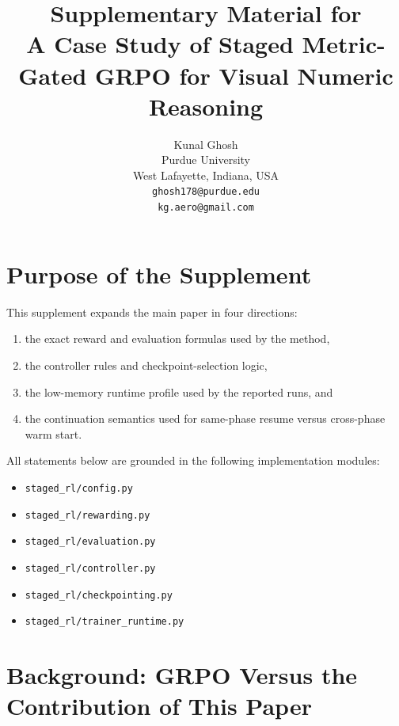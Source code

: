 \documentclass{article} %
\title{Supplementary Material for\\A Case Study of Staged Metric-Gated GRPO for Visual Numeric Reasoning}
\author{Kunal Ghosh\\
Purdue University\\
West Lafayette, Indiana, USA\\
\texttt{ghosh178@purdue.edu}\\
\texttt{kg.aero@gmail.com}}
\begin{document}
\maketitle
\fancyhead{}
\lhead{}
\chead{}
\rhead{}

\section{Purpose of the Supplement}

This supplement expands the main paper in four directions:
\begin{enumerate}[leftmargin=1.2em]
\item the exact reward and evaluation formulas used by the method,
\item the controller rules and checkpoint-selection logic,
\item the low-memory runtime profile used by the reported runs, and
\item the continuation semantics used for same-phase resume versus cross-phase warm start.
\end{enumerate}
All statements below are grounded in the following implementation modules:
\begin{itemize}[leftmargin=1.2em]
\item \texttt{staged\_rl/config.py}
\item \texttt{staged\_rl/rewarding.py}
\item \texttt{staged\_rl/evaluation.py}
\item \texttt{staged\_rl/controller.py}
\item \texttt{staged\_rl/checkpointing.py}
\item \texttt{staged\_rl/trainer\_runtime.py}
\end{itemize}

\section{Background: GRPO Versus the Contribution of This Paper}
\end{document}
